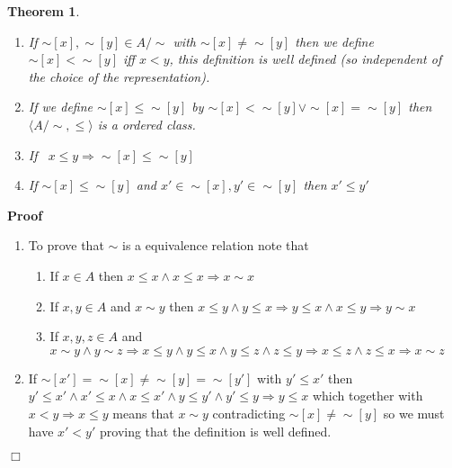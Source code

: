 \documentclass{book}
\newenvironment{proof}{\noindent\textbf{Proof\ }}{\hspace*{\fill}$\Box$\medskip}
\newtheorem{theorem}{Theorem}
\begin{document}
{{\begin{theorem}
\begin{enumerate}
    \item If $\sim [x], \sim [y] \in A / \sim$ with $\sim [x] \neq \sim [y]$
    then we define $\sim [x] < \sim [y]$ iff $x < y$, this definition is well
    defined (so independent of the choice of the representation).
    
    \item If we define $\sim [x] \leqslant \sim [y]$ by $\sim [x] < \sim [y]
    \vee \sim [x] = \sim [y]$ then \ $\langle A / \sim, \leqslant \rangle$ is
    a ordered class.
    
    \item If \ $x \leqslant y \Rightarrow \sim [x] \leqslant \sim [y]$
    
    \item If $\sim [x] \leqslant \sim [y]$ and $x' \in \sim [x], y' \in \sim
    [y]$ then $x' \leqslant y'$
  \end{enumerate}
\end{theorem}

\begin{proof}
  
  \begin{enumerate}
    \item To prove that $\sim$ is a equivalence relation note that
    \begin{enumerate}
      \item If $x \in A$ then $x \leqslant x \wedge x \leqslant x \Rightarrow
      x \sim x$
      
      \item If $x, y \in A$ and $x \sim y$ then $x \leqslant y \wedge y
      \leqslant x \Rightarrow y \leqslant x \wedge x \leqslant y \Rightarrow y
      \sim x$
      
      \item If $x, y, z \in A$ and $x \sim y \wedge y \sim z \Rightarrow x
      \leqslant y \wedge y \leqslant x \wedge y \leqslant z \wedge z \leqslant
      y \Rightarrow x \leqslant z \wedge z \leqslant x \Rightarrow x \sim z$
    \end{enumerate}
    \item If $\sim [x'] = \sim [x] \neq \sim [y] = \sim [y']$ with $y'
    \leqslant x'$ then $y' \leqslant x' \wedge x' \leqslant x \wedge x
    \leqslant x' \wedge y \leqslant y' \wedge y' \leqslant y \Rightarrow y
    \leqslant x$ which together with $x < y \Rightarrow x \leqslant y$ means
    that $x \sim y$ contradicting $\sim [x] \neq \sim [y]$ so we must have $x'
    < y'$ proving that the definition is well defined.
    

\end{enumerate}
\end{proof}}}
\end{document}
